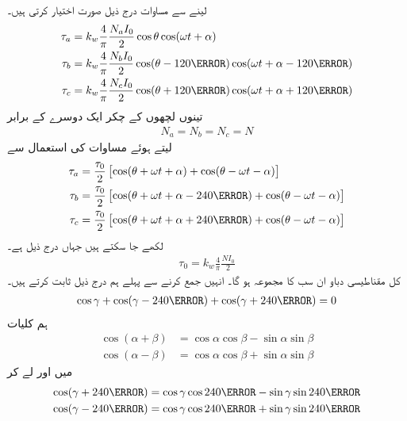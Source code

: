 لینے سے  مساوات  درج ذیل صورت اختیار کرتی ہیں۔
\begin{gather}
\begin{aligned}
\tau_a&=k_w \frac{4}{\pi}\frac{N_a I_0}{2} \cos \theta \cos (\omega t +\alpha)\\
\tau_b&=k_w \frac{4}{\pi}\frac{N_b I_0}{2} \cos (\theta -120\degree)\cos (\omega t +\alpha -120\degree)\\
\tau_c&=k_w \frac{4}{\pi}\frac{N_c I_0}{2} \cos (\theta +120\degree)\cos (\omega t +\alpha +120\degree)
\end{aligned}
\end{gather}
تینوں لچھوں کے چکر ایک دوسرے کے برابر
\begin{align*}
N_a=N_b=N_c=N
\end{align*}
لیتے ہوئے مساوات  کی استعمال سے
\begin{gather}
\begin{aligned}\label{مساوات_تبادلہ_تین_گھومتے_دباو}
\tau_a&=\frac{\tau_0}{2} \left[\cos (\theta +\omega t +\alpha) +\cos (\theta -\omega t -\alpha) \right]\\
\tau_b&=\frac{\tau_0}{2} \left[\cos (\theta +\omega t +\alpha-240\degree) +\cos (\theta -\omega t -\alpha) \right]\\
\tau_c&=\frac{\tau_0}{2} \left[\cos (\theta +\omega t +\alpha+240\degree) +\cos (\theta -\omega t -\alpha) \right]
\end{aligned}
\end{gather}
لکھے جا سکتے ہیں جہاں  درج ذیل ہے۔
\begin{align}
\tau_0=k_w \frac{4}{\pi}\frac{N I_0}{2}
\end{align}
کل مقناطیسی دباو  ان سب کا مجموعہ ہو گا۔ انہیں جمع کرنے سے پہلے ہم  درج ذیل ثابت کرتے ہیں۔
\begin{align*}
\cos \gamma +\cos (\gamma -240\degree)+\cos (\gamma+240\degree)=0
\end{align*}
ہم  کلیات 
\begin{align*}
\cos  (\alpha +\beta)&=\cos \alpha \cos \beta-\sin \alpha \sin \beta\\
\cos  (\alpha -\beta)&=\cos \alpha \cos \beta+\sin \alpha \sin \beta
\end{align*}
 میں   اور  لے کر
\begin{align*}
\cos (\gamma+240\degree)&=\cos \gamma \cos 240\degree-\sin \gamma \sin 240\degree\\
\cos (\gamma-240\degree)&=\cos \gamma \cos 240\degree+\sin \gamma \sin 240\degree
\end{align*}
